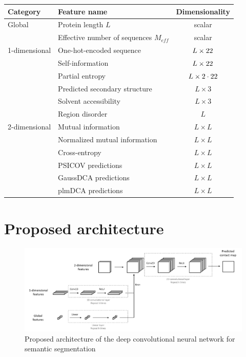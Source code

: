   \begin{table}[H]
    \centering
    \begin{tabular}{|l|l|c|}
      \hline
      Category & Feature name & Dimensionality \\
      \hline
      \hline
      Global & Protein length $L$ & scalar \\
             & Effective number of sequences $M_{eff}$ & scalar \\
      \hline
      1-dimensional & One-hot-encoded sequence & $L \times 22$ \\
                    & Self-information & $L \times 22$ \\
                    & Partial entropy & $L \times 2 \cdot 22$ \\
                    & Predicted secondary structure & $L \times 3$ \\
                    & Solvent accessibility & $L \times 3$ \\
                    & Region disorder & $L$ \\
      \hline
      2-dimensional & Mutual information & $L \times L$ \\
                    & Normalized mutual information & $L \times L$ \\
                    & Cross-entropy & $L \times L$ \\
                    & PSICOV predictions & $L \times L$ \\
                    & GaussDCA predictions & $L \times L$ \\
                    & plmDCA predictions & $L \times L$ \\
      \hline
    \end{tabular}
    \label{hyperparams}
  \end{table}

\section{Proposed architecture}

  \begin{figure}[H]
    \begin{center}
      \includegraphics[width=\textwidth, keepaspectratio]{imgs/architecture.png}
       \caption{Proposed architecture of the deep convolutional neural network for semantic segmentation}
      \label{architecture}
    \end{center}
  \end{figure}

